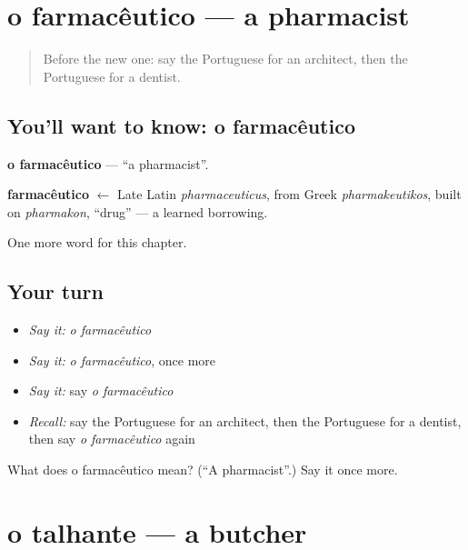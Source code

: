 \section[o farmacêutico]{o farmacêutico — a pharmacist}

\label{lesson:PT-C220-farmaceutico}



\begin{quote}
Before the new one: say the Portuguese for an architect, then the Portuguese for a dentist.
\end{quote}

\subsection*{You'll want to know: o farmacêutico}
\textbf{o farmacêutico} — \textquotedblleft{}a pharmacist\textquotedblright{}.

\begin{cousinweb}
\textbf{farmacêutico} $\leftarrow$ Late Latin \emph{pharmaceuticus}, from Greek \emph{pharmakeutikos}, built on \emph{pharmakon}, \textquotedblleft{}drug\textquotedblright{} — a learned borrowing.
\end{cousinweb}

\begin{grammarlens}[title={What you've built}]
One more word for this chapter.
\end{grammarlens}

\subsection*{Your turn}
\begin{itemize}
\raggedright
  \item \emph{Say it:} \emph{o farmacêutico}
  \item \emph{Say it:} \emph{o farmacêutico}, once more
  \item \emph{Say it:} say \emph{o farmacêutico}
  \item \emph{Recall:} say the Portuguese for an architect, then the Portuguese for a dentist, then say \emph{o farmacêutico} again
\end{itemize}

\begin{tcolorbox}[breakable,colback=teal!4,colframe=teal!35!black,title={Before you move on}]
What does o farmacêutico mean? (\textquotedblleft{}A pharmacist\textquotedblright{}.) Say it once more.
\end{tcolorbox}
\section[o talhante]{o talhante — a butcher}

